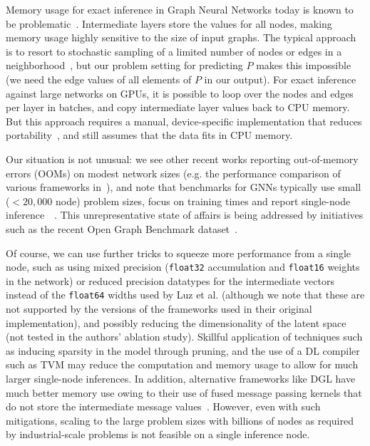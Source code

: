 \documentclass{svproc}
\newcommand{\etal}{et al. }
\begin{document}
Memory usage for exact inference in Graph Neural Networks today is known to be problematic~\cite{wu2020comprehensive}. Intermediate layers store the values for all nodes, making memory usage highly sensitive to the size of input graphs. The typical approach is to resort to stochastic sampling of a limited number of nodes or edges in a neighborhood~\cite{graphsage}, but our problem setting for predicting $P$ makes this impossible (we need the edge values of all elements of $P$ in our output). For exact inference against large networks on GPUs, it is possible to loop over the nodes and edges per layer in batches, and copy intermediate layer values back to CPU memory. But this approach requires a manual, device-specific implementation that reduces portability~\cite{inference-against-large-graphs}, and still assumes that the data fits in CPU memory.  

Our situation is not unusual: we see other recent works reporting out-of-memory errors (OOMs) on modest network sizes (e.g. the performance comparison of various frameworks in~\cite{DGL}), and note that benchmarks for GNNs typically use small ($<20,000$ node) problem sizes, focus on training times and report single-node inference~\cite{dwivedi2020benchmarking}~\cite{Wu2021}. This unrepresentative state of affairs is being addressed by initiatives such as the recent Open Graph Benchmark dataset~\cite{hu2020open}.


Of course, we can use further tricks to squeeze more performance from a single node, such as using mixed precision (\texttt{float32} accumulation and \texttt{float16} weights in the network) or reduced precision datatypes for the intermediate vectors instead of the \texttt{float64} widths used by Luz \etal (although we note that these are not supported by the versions of the frameworks used in their original implementation), and possibly reducing the dimensionality of the latent space (not tested in the authors' ablation study). Skillful application of techniques such as inducing sparsity in the model through pruning, and the use of a DL compiler such as TVM \cite{TVM} may reduce the computation and memory usage to allow for much larger single-node inferences. In addition, alternative frameworks like DGL have much better memory use owing to their use of fused message passing kernels that do not store the intermediate message values~\cite{DGL}. However, even with such mitigations, scaling to the large problem sizes with billions of nodes as required by industrial-scale problems is not feasible on a single inference node. 
\end{document}
